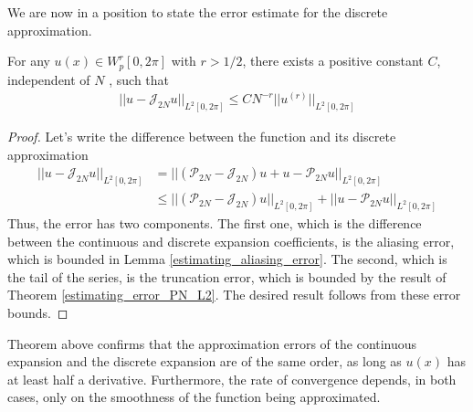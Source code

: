     We are now in a position to state the error estimate for the discrete approximation.
    \begin{teor}
    \label{estimating_error_I_N_L2}	
    For any $u(x) \in W_p^r [0, 2\pi]$ with $r > 1/2$, there exists a positive constant $C$, independent of $N$ , such that
    \begin{align*}
        || u - \mathcal{J}_{2N}u ||_{L^2 [0, 2\pi]} \leq CN^{-r} || u^{(r)} ||_{L^2 [0, 2\pi]}
    \end{align*}
	\end{teor}
    \begin{proof}
    Let’s write the difference between the function and its discrete approximation
    \begin{align*}
        || u - \mathcal{J}_{2N}u ||_{L^2 [0, 2\pi]} &= || (\mathcal{P}_{2N} - \mathcal{J}_{2N})u + u - \mathcal{P}_{2N}u||_{L^2 [0, 2\pi] } \\
        &\leq  || (\mathcal{P}_{2N} - \mathcal{J}_{2N})u ||_{L^2 [0, 2\pi] } + || u - \mathcal{P}_{2N}u ||_{L^2 [0, 2\pi] }
    \end{align*}
    Thus, the error has two components. The first one, which is the difference between the continuous and discrete expansion coefficients, is the aliasing error, which is bounded in Lemma \ref{estimating_aliasing_error}. The second, which is the tail of the series, is the truncation error, which is bounded by the result of Theorem \ref{estimating_error_PN_L2}. The desired result follows from these error bounds.
	\end{proof}

    Theorem above confirms that the approximation errors of the continuous expansion and the discrete expansion are of the same order, as long as $u(x)$ has at least half a derivative. Furthermore, the rate of convergence depends, in both cases, only on the smoothness of the function being approximated.